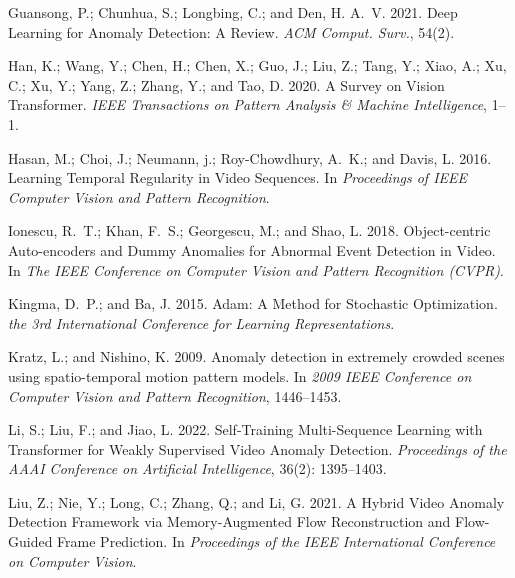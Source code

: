 \documentclass[letterpaper]{article} \usepackage{aaai23}  \usepackage{times}  \usepackage{helvet}  \usepackage{courier}  \usepackage[hyphens]{url}  \usepackage{graphicx} \urlstyle{rm} \def\UrlFont{\rm}  \usepackage{natbib}  \usepackage{caption} \frenchspacing  \setlength{\pdfpagewidth}{8.5in}  \setlength{\pdfpageheight}{11in}  \usepackage{algorithm}
\begin{document}
\begin{thebibliography}{50}
Guansong, P.; Chunhua, S.; Longbing, C.; and Den, H. A.~V. 2021.
\newblock Deep Learning for Anomaly Detection: A Review.
\newblock \emph{ACM Comput. Surv.}, 54(2).

Han, K.; Wang, Y.; Chen, H.; Chen, X.; Guo, J.; Liu, Z.; Tang, Y.; Xiao, A.;
  Xu, C.; Xu, Y.; Yang, Z.; Zhang, Y.; and Tao, D. 2020.
\newblock A Survey on Vision Transformer.
\newblock \emph{IEEE Transactions on Pattern Analysis \& Machine Intelligence},
  1--1.

Hasan, M.; Choi, J.; Neumann, j.; Roy-Chowdhury, A.~K.; and Davis, L. 2016.
\newblock Learning Temporal Regularity in Video Sequences.
\newblock In \emph{Proceedings of IEEE Computer Vision and Pattern
  Recognition}.

Ionescu, R.~T.; Khan, F.~S.; Georgescu, M.; and Shao, L. 2018.
\newblock Object-centric Auto-encoders and Dummy Anomalies for Abnormal Event
  Detection in Video.
\newblock In \emph{The IEEE Conference on Computer Vision and Pattern
  Recognition (CVPR)}.

Kingma, D.~P.; and Ba, J. 2015.
\newblock Adam: A Method for Stochastic Optimization.
\newblock \emph{the 3rd International Conference for Learning Representations}.

Kratz, L.; and Nishino, K. 2009.
\newblock Anomaly detection in extremely crowded scenes using spatio-temporal
  motion pattern models.
\newblock In \emph{2009 IEEE Conference on Computer Vision and Pattern
  Recognition}, 1446--1453.

Li, S.; Liu, F.; and Jiao, L. 2022.
\newblock Self-Training Multi-Sequence Learning with Transformer for Weakly
  Supervised Video Anomaly Detection.
\newblock \emph{Proceedings of the AAAI Conference on Artificial Intelligence},
  36(2): 1395--1403.

Liu, Z.; Nie, Y.; Long, C.; Zhang, Q.; and Li, G. 2021.
\newblock A Hybrid Video Anomaly Detection Framework via Memory-Augmented Flow
  Reconstruction and Flow-Guided Frame Prediction.
\newblock In \emph{Proceedings of the IEEE International Conference on Computer
  Vision}.


\end{thebibliography}
\end{document}
